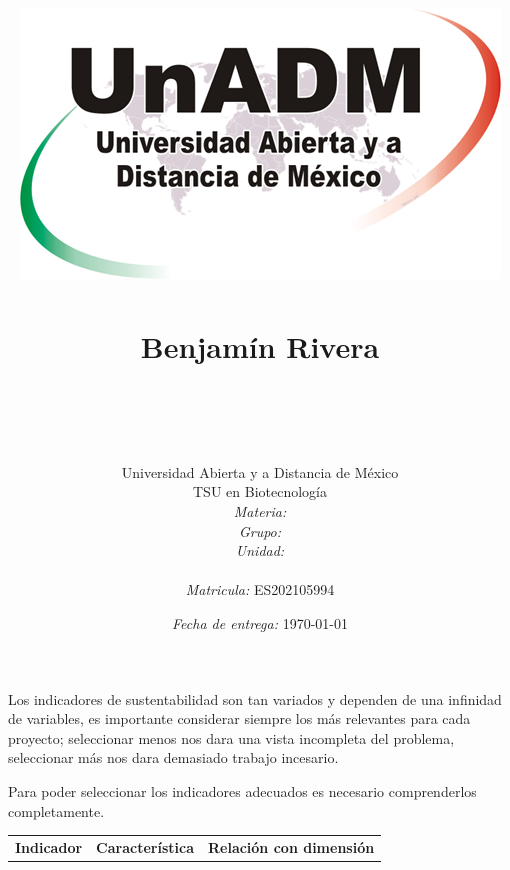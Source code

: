 \documentclass[12pt]{article}
\title{
	\includegraphics{../../../assets/logo-unadm} \\
	\ \\ Benjam\'in Rivera \\
	\bf{\titulo}\\\ \\}
\author{
	Universidad Abierta y a Distancia de México \\
	TSU en Biotecnolog\'ia \\
	\textit{Materia:} \materia \\
	\textit{Grupo:} \grupo \\
	\textit{Unidad:} \unidad \\
	\\
	\textit{Matricula:} ES202105994 }
\date{\textit{Fecha de entrega:} \today}
\begin{document}
\maketitle\newpage

	\par Los indicadores de sustentabilidad son tan variados y dependen de una infinidad de variables, es importante considerar siempre los m\'as relevantes para cada proyecto; seleccionar menos nos dara una vista incompleta del problema, seleccionar m\'as nos dara demasiado trabajo incesario.
	
	\par Para poder seleccionar los indicadores adecuados es necesario comprenderlos completamente.

\begin{longtable}[]{@{}rll@{}}

	\begin{minipage}[b]{0.37\columnwidth}\raggedleft\bf
	Indicador\strut
	\end{minipage} & \begin{minipage}[b]{0.27\columnwidth}\raggedright\bf
	Característica\strut
	\end{minipage} & \begin{minipage}[b]{0.27\columnwidth}\raggedright\bf
	Relación con dimensión\strut
	\end{minipage}\tabularnewline


\end{longtable}
\end{document}
